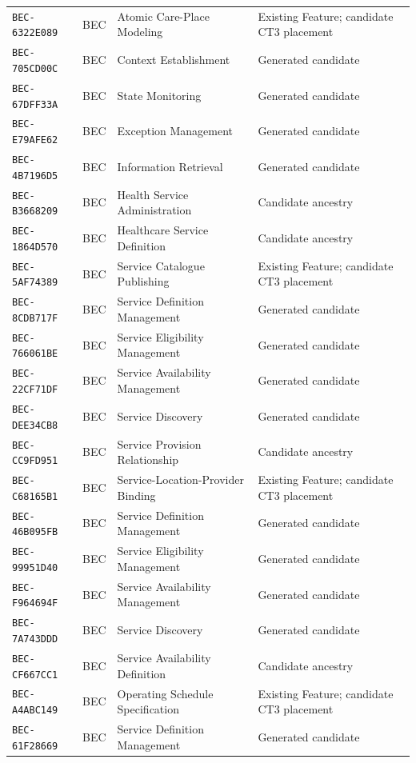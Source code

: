 \documentclass[11pt,a4paper,openany]{book}
\begin{document}
\begin{longtable}{@{}p{.19\linewidth}p{.12\linewidth}p{.39\linewidth}p{.24\linewidth}@{}}
\texttt{BEC-6322E089} & BEC & Atomic Care-Place Modeling & Existing Feature; candidate CT3 placement \\
\texttt{BEC-705CD00C} & BEC & Context Establishment & Generated candidate \\
\texttt{BEC-67DFF33A} & BEC & State Monitoring & Generated candidate \\
\texttt{BEC-E79AFE62} & BEC & Exception Management & Generated candidate \\
\texttt{BEC-4B7196D5} & BEC & Information Retrieval & Generated candidate \\
\texttt{BEC-B3668209} & BEC & Health Service Administration & Candidate ancestry \\
\texttt{BEC-1864D570} & BEC & Healthcare Service Definition & Candidate ancestry \\
\texttt{BEC-5AF74389} & BEC & Service Catalogue Publishing & Existing Feature; candidate CT3 placement \\
\texttt{BEC-8CDB717F} & BEC & Service Definition Management & Generated candidate \\
\texttt{BEC-766061BE} & BEC & Service Eligibility Management & Generated candidate \\
\texttt{BEC-22CF71DF} & BEC & Service Availability Management & Generated candidate \\
\texttt{BEC-DEE34CB8} & BEC & Service Discovery & Generated candidate \\
\texttt{BEC-CC9FD951} & BEC & Service Provision Relationship & Candidate ancestry \\
\texttt{BEC-C68165B1} & BEC & Service-Location-Provider Binding & Existing Feature; candidate CT3 placement \\
\texttt{BEC-46B095FB} & BEC & Service Definition Management & Generated candidate \\
\texttt{BEC-99951D40} & BEC & Service Eligibility Management & Generated candidate \\
\texttt{BEC-F964694F} & BEC & Service Availability Management & Generated candidate \\
\texttt{BEC-7A743DDD} & BEC & Service Discovery & Generated candidate \\
\texttt{BEC-CF667CC1} & BEC & Service Availability Definition & Candidate ancestry \\
\texttt{BEC-A4ABC149} & BEC & Operating Schedule Specification & Existing Feature; candidate CT3 placement \\
\texttt{BEC-61F28669} & BEC & Service Definition Management & Generated candidate \\

\end{longtable}
\end{document}
